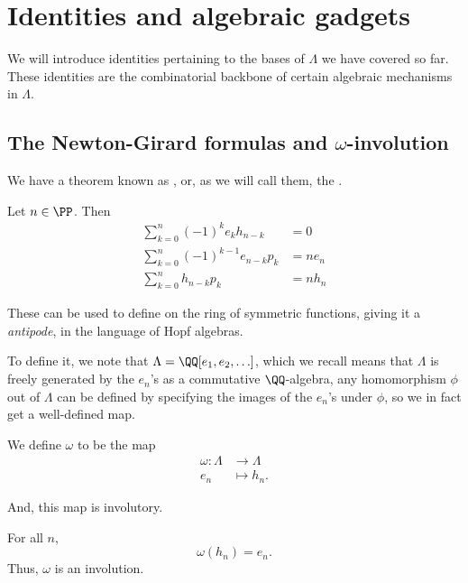 \documentclass{article}
\newcommand{\pring}[2]{#1 [ {#2} ]}
\begin{document}
\section{Identities and algebraic gadgets}

We will introduce identities pertaining to the bases of $\Lambda$ we have covered so far.
These identities are the combinatorial backbone of certain algebraic mechanisms in $\Lambda$.

\subsection{
    The Newton-Girard formulas
    and $\omega$-involution
}

We have a theorem known as , or, as we will call them, the .

\begin{theorem}
    Let $n \in \PP$. Then
    \begin{align}
        \sum_{k=0}^n (-1)^k e_kh_{n-k} &= 0 \label{ng1} \\
        \sum_{k=0}^n (-1)^{k-1} e_{n-k}p_k &= ne_n  \label{ng2} \\
        \sum_{k=0}^n h_{n-k}p_k &= nh_n \label{eq:ng3}
    \end{align}
\end{theorem}

These can be used to define  on the ring of symmetric functions, giving it a \textit{antipode}, in the language of Hopf algebras.

To define it, we note that $\Lambda = \pring{\QQ}{e_1,e_2,\ldots}$, which we recall means that $\Lambda$ is freely generated by the $e_n$'s as a commutative $\QQ$-algebra, any homomorphism $\phi$ out of $\Lambda$ can be defined by specifying the images of the $e_n$'s under $\phi$, so we in fact get a well-defined map.

\begin{definition}
    We define $\omega$ to be the map 
    \begin{align*}
        \omega: \Lambda &\to \Lambda \\
        e_n &\mapsto h_n.
    \end{align*}
\end{definition}

And, this map is involutory.

\begin{theorem}
    \label{thm:OmegaIsInvolution}
    For all $n$,
    \[
        \omega(h_n) = e_n.
    \]
    Thus, $\omega$ is an involution.
\end{theorem}
\end{document}
